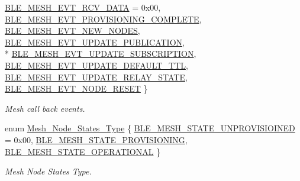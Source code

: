 \begin{DoxyCompactItemize}
\hyperlink{group___m_e_s_h_ggaa213f0dfb25460197ad32e6ab1921f66a23f6607b7051c22d2021d6fda7102e13}{B\+L\+E\+\_\+\+M\+E\+S\+H\+\_\+\+E\+V\+T\+\_\+\+R\+C\+V\+\_\+\+D\+A\+TA} = 0x00, 
\hyperlink{group___m_e_s_h_ggaa213f0dfb25460197ad32e6ab1921f66ae52fee8eeea04bd28c836b1c61342e38}{B\+L\+E\+\_\+\+M\+E\+S\+H\+\_\+\+E\+V\+T\+\_\+\+P\+R\+O\+V\+I\+S\+I\+O\+N\+I\+N\+G\+\_\+\+C\+O\+M\+P\+L\+E\+TE}, 
\hyperlink{group___m_e_s_h_ggaa213f0dfb25460197ad32e6ab1921f66af2c5e147c4320ea9dd5f744cd4d2a30f}{B\+L\+E\+\_\+\+M\+E\+S\+H\+\_\+\+E\+V\+T\+\_\+\+N\+E\+W\+\_\+\+N\+O\+D\+ES}, 
\hyperlink{group___m_e_s_h_ggaa213f0dfb25460197ad32e6ab1921f66a5237880c55f867838a8e36d93a6ecf18}{B\+L\+E\+\_\+\+M\+E\+S\+H\+\_\+\+E\+V\+T\+\_\+\+U\+P\+D\+A\+T\+E\+\_\+\+P\+U\+B\+L\+I\+C\+A\+T\+I\+ON}, 
\\*
\hyperlink{group___m_e_s_h_ggaa213f0dfb25460197ad32e6ab1921f66ace2765fa89e3589acab24bbf246b4a0c}{B\+L\+E\+\_\+\+M\+E\+S\+H\+\_\+\+E\+V\+T\+\_\+\+U\+P\+D\+A\+T\+E\+\_\+\+S\+U\+B\+S\+C\+R\+I\+P\+T\+I\+ON}, 
\hyperlink{group___m_e_s_h_ggaa213f0dfb25460197ad32e6ab1921f66a7163370ca14a1b2deb17227d2d7f4b4f}{B\+L\+E\+\_\+\+M\+E\+S\+H\+\_\+\+E\+V\+T\+\_\+\+U\+P\+D\+A\+T\+E\+\_\+\+D\+E\+F\+A\+U\+L\+T\+\_\+\+T\+TL}, 
\hyperlink{group___m_e_s_h_ggaa213f0dfb25460197ad32e6ab1921f66a6c6604ad8f69f6819d39930e6b869d1a}{B\+L\+E\+\_\+\+M\+E\+S\+H\+\_\+\+E\+V\+T\+\_\+\+U\+P\+D\+A\+T\+E\+\_\+\+R\+E\+L\+A\+Y\+\_\+\+S\+T\+A\+TE}, 
\hyperlink{group___m_e_s_h_ggaa213f0dfb25460197ad32e6ab1921f66a3fbca500171093af15ba65cf9fd82ef7}{B\+L\+E\+\_\+\+M\+E\+S\+H\+\_\+\+E\+V\+T\+\_\+\+N\+O\+D\+E\+\_\+\+R\+E\+S\+ET}
 \}\begin{DoxyCompactList}\small\item\em Mesh call back events. \end{DoxyCompactList}
\item 
enum \hyperlink{group___m_e_s_h_ga5714e7338d1ee21a5ba37747370c6486}{Mesh\+\_\+\+Node\+\_\+\+States\+\_\+\+Type} \{ \hyperlink{group___m_e_s_h_gga5714e7338d1ee21a5ba37747370c6486a774dcbfbb304f7603ca5c9d2d369130c}{B\+L\+E\+\_\+\+M\+E\+S\+H\+\_\+\+S\+T\+A\+T\+E\+\_\+\+U\+N\+P\+R\+O\+V\+I\+S\+I\+O\+I\+N\+ED} = 0x00, 
\hyperlink{group___m_e_s_h_gga5714e7338d1ee21a5ba37747370c6486a98b2162768c4b79087791203df11d0ea}{B\+L\+E\+\_\+\+M\+E\+S\+H\+\_\+\+S\+T\+A\+T\+E\+\_\+\+P\+R\+O\+V\+I\+S\+I\+O\+N\+I\+NG}, 
\hyperlink{group___m_e_s_h_gga5714e7338d1ee21a5ba37747370c6486ae27a10c63fc4cf149f37a5b79c8ef4fd}{B\+L\+E\+\_\+\+M\+E\+S\+H\+\_\+\+S\+T\+A\+T\+E\+\_\+\+O\+P\+E\+R\+A\+T\+I\+O\+N\+AL}
 \}\begin{DoxyCompactList}\small\item\em Mesh Node States Type. \end{DoxyCompactList}
\end{DoxyCompactItemize}
